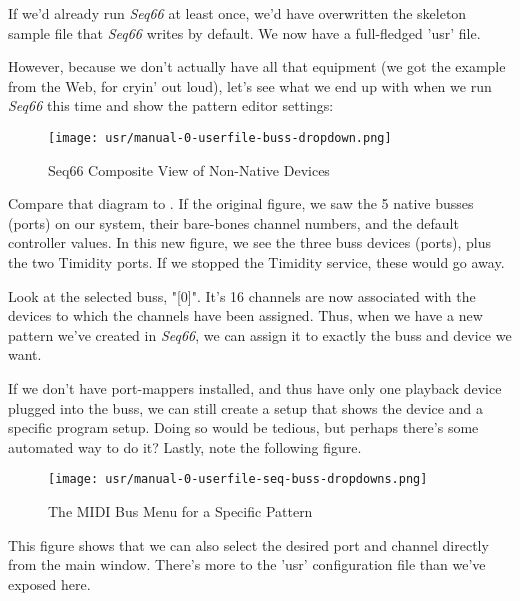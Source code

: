    If we'd already run \textsl{Seq66} at least once, we'd have
   overwritten the skeleton sample file that \textsl{Seq66}
   writes by default.  We now have a full-fledged 'usr' file.

   However, because we don't actually have all that equipment (we got the
   example from the Web, for cryin' out loud), let's see what we end up with
   when we run \textsl{Seq66} this time and show the pattern editor
   settings:

\begin{figure}[H]
   \centering 
   \texttt{[image: usr/manual-0-userfile-buss-dropdown.png]}
   \caption{Seq66 Composite View of Non-Native Devices}
   \label{fig:manual_0_userfile_buss_dropdown}
\end{figure}

   Compare that diagram to .
   If the original figure, we saw the 5 native busses (ports) on our system,
   their bare-bones channel numbers, and the default controller values.  In
   this new figure, we see the three buss devices (ports), plus the two
   Timidity ports.  If we stopped the Timidity service, these would go away.

   Look at the selected buss, "[0]".  It's 16 channels are now associated with
   the devices to which the channels have been assigned.
   Thus, when we have a new pattern we've created in \textsl{Seq66},
   we can assign it to exactly the buss and device we want.

   If we don't have port-mappers installed, and thus have only one playback
   device plugged into the buss, we can still create a setup that
   shows the device and a specific program setup.  Doing so would be tedious,
   but perhaps there's some automated way to do it?
   Lastly, note the following figure.

\begin{figure}[H]
   \centering 
   \texttt{[image: usr/manual-0-userfile-seq-buss-dropdowns.png]}
   \caption{The MIDI Bus Menu for a Specific Pattern}
   \label{fig:manual_0_userfile_seq_buss_dropdown}
\end{figure}

   This figure shows that we can also select the desired port and channel
   directly from the main window.
   There's more to the 'usr' configuration file than we've exposed here.


